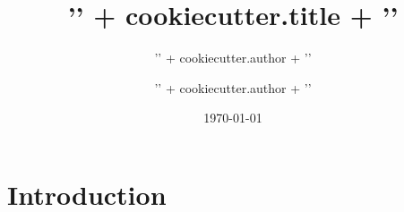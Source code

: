 \documentclass[english,a4paper]{article}
\title{{'{' + cookiecutter.title + '}'}}
\author{{'{' + cookiecutter.author + '}'}}
\affil{{'{' + cookiecutter.affiliation + '\\\\' + '\n  ' +
  '\\href{mailto:' + cookiecutter.email + 
  '}{\\nolinkurl{' + cookiecutter.email + '}}}'}}
\author[1,*]{{'{' + cookiecutter.author + '}'}}
\affil[1]{{'{' + cookiecutter.affiliation + '}'}}
\affil[*]{Corresponding author:
  \href{mailto:{{cookiecutter.email}}}{\nolinkurl{{'{' + cookiecutter.email + '}'}}}
}
\date{\today}
\begin{document}
\maketitle


\section{Introduction}%
\label{introduction}

\end{document}
